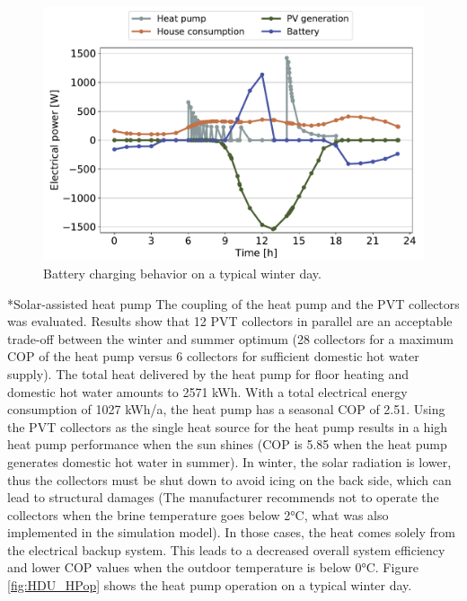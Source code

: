 \documentclass[twocolumn, a4paper,10pt]{article}
\makeatletter
\renewcommand\subsection{\@startsection{subsection}{1}{\z@}{\z@}{\z@}{\normalfont\normalsize\bfseries}}
\renewcommand\subsection{\@startsection{subsection}{1}{\z@}{\z@}{0.1pt}{\normalfont\normalsize\bfseries}}
\makeatother
\begin{document}
\begin{figure}[ht]
\vspace{-5pt} 
\centering
\includegraphics[scale=0.34]{img/HDU_ELbal.pdf}
\caption{Battery charging behavior on a typical winter day.}
\label{fig:HDU_ELbal}
\end{figure}

\subsection*{Solar-assisted heat pump}
The coupling of the heat pump and the PVT collectors was evaluated. Results show that 12 PVT collectors in parallel are an acceptable trade-off between the winter and summer optimum (28 collectors for a maximum COP of the heat pump versus 6 collectors for sufficient domestic hot water supply). The total heat delivered by the heat pump for floor heating and domestic hot water amounts to 2571 kWh. With a total electrical energy consumption of 1027 kWh/a, the heat pump has a seasonal COP of 2.51. Using the PVT collectors as the single heat source for the heat pump results in a high heat pump performance when the sun shines (COP is 5.85 when the heat pump generates domestic hot water in summer). In winter, the solar radiation is lower, thus the collectors must be shut down to avoid icing on the back side, which can lead to structural damages (The manufacturer recommends not to operate the collectors when the brine temperature goes below 2°C, what was also implemented in the simulation model). In those cases, the heat comes solely from the electrical backup system. This leads to a decreased overall system efficiency and lower COP values when the outdoor temperature is below 0°C. Figure \ref{fig:HDU_HPop} shows the heat pump operation on a typical winter day.\\
\end{document}
